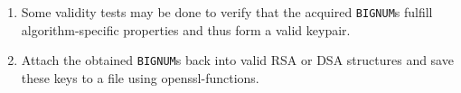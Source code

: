 \begin{enumerate}
%
%

	\item Some validity tests may be done to verify that the acquired
	\texttt{BIGNUM}s fulfill algorithm-specific properties and thus form a valid
	keypair.

	\item Attach the obtained \texttt{BIGNUM}s back into valid RSA or DSA
		structures and save these keys to a file using
		openssl-functions.
	
\end{enumerate}




